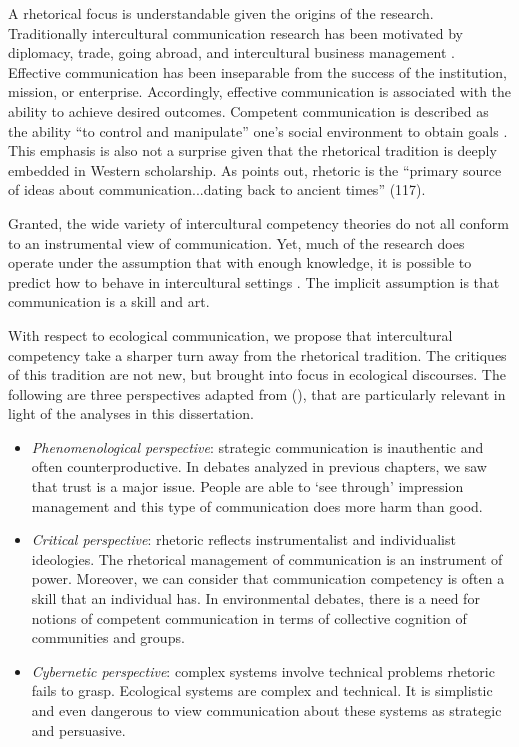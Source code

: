 A rhetorical focus is understandable given the origins of the research. Traditionally intercultural communication research has been motivated by diplomacy, trade, going abroad, and intercultural business management \citep{Jensen2014}. Effective communication has been inseparable from the success of the institution, mission, or enterprise. Accordingly, effective communication is associated with the ability to achieve desired outcomes. Competent communication is described as the ability ``to control and manipulate'' one's social environment to obtain goals \cite[209]{Wiseman2001}. This emphasis is also not a surprise given that the rhetorical tradition is deeply embedded in Western scholarship. As \cite*{Littlejohn1996} points out, rhetoric is the ``primary source of ideas about communication...dating back to ancient times'' (117). 

Granted, the wide variety of intercultural competency theories do not all conform to an instrumental view of communication. Yet, much of the research does operate under the assumption that with enough knowledge, it is possible to predict how to behave in intercultural settings \citep{Jensen2014}. The implicit assumption is that communication is a skill and art.

With respect to ecological communication, we propose that intercultural competency take a sharper turn away from the rhetorical tradition. The critiques of this tradition are not new, but brought into focus in ecological discourses. The following are three perspectives adapted from \citeauthor{Craig1999a} (\citeyear[134]{Craig1999a}), that are particularly relevant in light of the analyses in this dissertation.

\begin{itemize}

    \item \textit{Phenomenological perspective}: strategic communication is inauthentic and often counterproductive. In debates analyzed in previous chapters, we saw that trust is a major issue. People are able to `see through' impression management and this type of communication does more harm than good.
    
    \item \textit{Critical perspective}: rhetoric reflects instrumentalist and individualist ideologies. The rhetorical management of communication is an instrument of power. Moreover, we can consider that communication competency is often a skill that an individual has. In environmental debates, there is a need for notions of competent communication in terms of collective cognition of communities and groups.  
    
    \item \textit{Cybernetic perspective}: complex systems involve technical problems rhetoric fails to grasp. Ecological systems are complex and technical. It is simplistic and even dangerous to view communication about these systems as strategic and persuasive.

\end{itemize}

